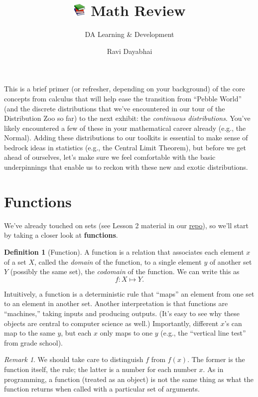\documentclass[12pt,english]{scrartcl}
\title{\vspace{-1.5cm}\includegraphics[scale=1.50]{1F4DA.pdf} Math Review} %
\subtitle{DA Learning \& Development}
\author{Ravi Dayabhai}
\theoremstyle{definition}
\newtheorem{definition}{Definition}[section]
\theoremstyle{remark}
\newtheorem*{remark}{Remark}
\begin{document}
\maketitle

This is a brief primer (or refresher, depending on your background) of the core
concepts from calculus that will help ease the transition from ``Pebble World'' (and the
discrete distributions that we've encountered in our tour of the Distribution
Zoo so far) to the next exhibit: the \emph{continuous distributions}. You've
likely encountered a few of these in your mathematical career already (e.g.,
the Normal).  Adding these distributions to our toolkits is essential to make
sense of bedrock ideas in statistics (e.g., the Central Limit Theorem), but
before we get ahead of ourselves, let's make sure we feel comfortable with the
basic underpinnings that enable us to reckon with these new and exotic
distributions.

\section{Functions}%
\label{sec:functions}

We've already touched on sets (see Lesson 2 material in our
\href{https://github.flexport.io/rdayabhai/da_prob_stat/tree/master/Lesson_2}{repo}),
so we'll start by taking a closer look at \textbf{functions}.

\begin{definition}[Function] A function is a relation that associates each
    element $x$ of a set $X$, called the \textit{domain} of the function, to a
    single element $y$ of another set $Y$ (possibly the same set), the
    \textit{codomain} of the function. We can write this as
    \[
        f \colon X \mapsto Y
    .\]
\end{definition}

Intuitively, a function is a deterministic rule that ``maps'' an element from
one set to an element in another set. Another interpretation is that functions
are ``machines,'' taking inputs and producing outputs. (It's easy to see
why these objects are central to computer science as well.) Importantly,
different $x$'s can map to the same $y$, but each $x$ only maps to one $y$
(e.g., the ``vertical line test'' from grade school).

\begin{remark} We should take care to distinguish $f$ from $f(x)$. The former
    is the function itself, the rule; the latter is a number for each number
    $x$. As in programming, a function (treated as an object) is not the same
    thing as what the function returns when called with a particular set of
    arguments.  \end{remark}
\end{document}
